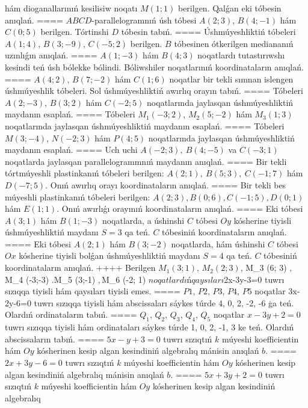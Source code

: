 hám dioganallarınıń kesilisiw noqatı $M (1;1) $ berilgen. Qalǵan eki
tóbesin anıqlań.
====
$ABCD$-parallelogramnıń úsh tóbesi
$A (2;3) $, $B (4;-1) $ hám $C (0;5) $ berilgen. Tórtinshi $D$
tóbesin tabıń.
====
Úshmúyeshliktiń tóbeleri $A (1;4) $, $B (3;-9) $, $C (-5;2) $
berilgen. $B$ tóbesinen ótkerilgen mediananıń uzınlıǵın anıqlań.
====
$A (1;-3) $ hám $B (4;3) $ noqatlardı tutastırıwshı
kesindi teń úsh bólekke bólindi. Bóliwshiler noqatlarınıń koordinataların
anıqlań.
====
$A (4;2) $, $B (7;-2) $ hám $C (1;6) $ noqatlar bir tekli
sımnan islengen úshmúyeshlik tóbeleri. Sol úshmúyeshliktiń awırlıq orayın tabıń.
====
Tóbeleri $A (2;-3) $, $B (3;2) $ hám $C (-2;5) $
noqatlarında jaylasqan úshmúyeshliktiń maydanın esaplań.
====
Tóbeleri $M_1 (-3;2) $, $M_2 (5;-2) $ hám $M_3 (1;3) $
noqatlarında jaylasqan úshmúyeshliktiń maydanın esaplań.
====
Tóbeleri $M (3;-4) $, $N (-2;3) $ hám $P (4;5) $
noqatlarında jaylasqan úshmúyeshliktiń maydanın esaplań.
====
Uch uchi $A (-2;3), \ B (4;-5) $ va
$C (-3;1)$ noqatlarda jaylasqan parallelogrammnıń maydanın anıqlań.
====
Bir tekli tórtmúyeshli plastinkanıń tóbeleri berilgen:
$A (2;1), \ B (5;3), \ C (-1;7) $ hám $D (-7;5) $. Onıń awırlıq orayı
koordinataların anıqlań.
====
Bir tekli bes múyeshli plastinkanıń tóbeleri berilgen:
$A (2;3), B (0;6), C (-1;5), D (0;1) $ hám $E (1;1) $. Onıń awırlıǵı
orayınıń koordinataların anıqlań.
====
Eki tóbesi $A (3;1) $ hám $B (1;-3) $ noqatlarda, a
úshinshi $C$ tóbesi $Oy$ kósherine tiyisli úshmúyeshliktiń
maydanı $S=3$ qa teń. $C$ tóbesiniń koordinataların anıqlań.
====
Eki tóbesi $A (2;1) $ hám $B (3;-2) $ noqatlarda, hám
úshinshi $C$ tóbesi $Ox$ kósherine tiyisli bolǵan úshmúyeshliktiń
maydanı $S=4$ qa teń. $C$ tóbesiniń koordinataların anıqlań.
++++
Berilgen $M_1 (3; 1) $, $M_2 (2; 3) $, M_3 (6; 3) $,
$M_4 (-3;-3) $. $M_5 (3;-1) $, $M_6 (-2; 1) $ noqatlardıń qaysıları
$2x-3y-3=0 tuwrı sızıqqa tiyisli hám qaysıları tiyisli
emes.
====
$P1$, $P2$, $P3$, $P4$, $P5$ noqatlar
3x-2y-6=0 tuwrı sızıqqa tiyisli hám abscissaları sáykes túrde
4, 0, 2, -2, -6 ģa teń. Olardıń ordinataların tabıń.
====
$Q_1$, $Q_2$, $Q_3$, $Q_4$, $Q_5$ noqatlar
$x-3y+2=0$ tuwrı sızıqqa tiyisli hám ordinataları sáykes túrde
1, 0, 2, -1, 3 ke teń. Olardıń abscissaların tabıń.
====
$5x-y+3=0$ tuwrı sızıqtıń $k$ múyeshi
koefficientin hám $Oy$ kósherinen kesip algan kesindiniń algebralıq
mánisin anıqlań $b$.
====
$2x+3y-6=0$ tuwrı sızıqtıń $k$ múyeshi
koefficientin hám $Oy$ kósherinen kesip algan kesindiniń algebralıq
mánisin anıqlań $b$.
====
$5x+3y+2=0$ tuwrı sızıqtıń $k$ múyeshi
koefficientin hám $Oy$ kósherinen kesip algan kesindiniń algebralıq
